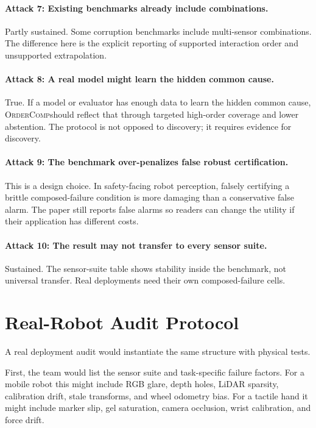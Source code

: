 \documentclass{article}
\newcommand{\method}{\textsc{OrderComp}}
\begin{document}
\paragraph{Attack 7: Existing benchmarks already include combinations.}
Partly sustained. Some corruption benchmarks include multi-sensor combinations. The difference here is the explicit reporting of supported interaction order and unsupported extrapolation.

\paragraph{Attack 8: A real model might learn the hidden common cause.}
True. If a model or evaluator has enough data to learn the hidden common cause, \method should reflect that through targeted high-order coverage and lower abstention. The protocol is not opposed to discovery; it requires evidence for discovery.

\paragraph{Attack 9: The benchmark over-penalizes false robust certification.}
This is a design choice. In safety-facing robot perception, falsely certifying a brittle composed-failure condition is more damaging than a conservative false alarm. The paper still reports false alarms so readers can change the utility if their application has different costs.

\paragraph{Attack 10: The result may not transfer to every sensor suite.}
Sustained. The sensor-suite table shows stability inside the benchmark, not universal transfer. Real deployments need their own composed-failure cells.

\section{Real-Robot Audit Protocol}

A real deployment audit would instantiate the same structure with physical tests.

First, the team would list the sensor suite and task-specific failure factors. For a mobile robot this might include RGB glare, depth holes, LiDAR sparsity, calibration drift, stale transforms, and wheel odometry bias. For a tactile hand it might include marker slip, gel saturation, camera occlusion, wrist calibration, and force drift.
\end{document}
